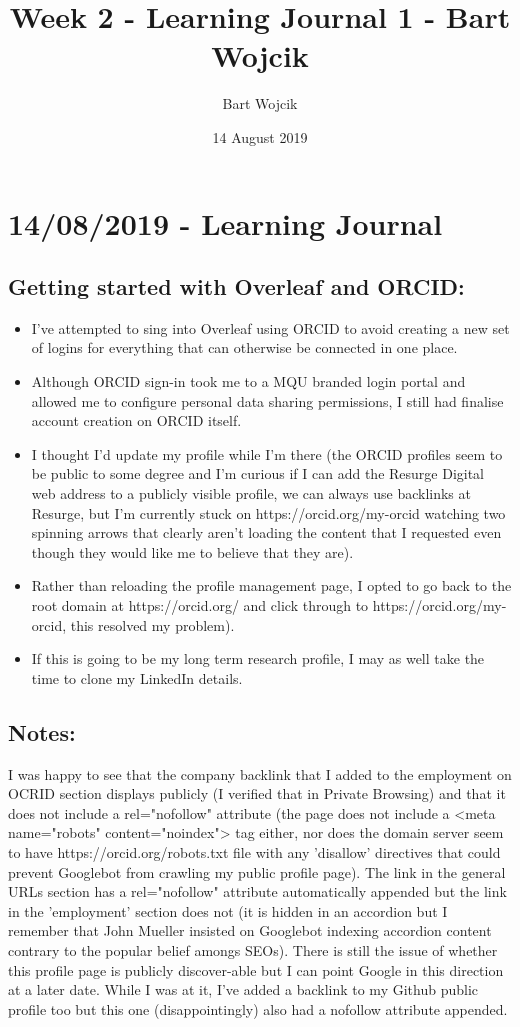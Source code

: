 \documentclass{article}
\title{Week 2 - Learning Journal 1 - Bart Wojcik}
\author{Bart Wojcik}
\date{14 August 2019}
\begin{document}
\maketitle

\section{14/08/2019 - Learning Journal}
\subsection{Getting started with Overleaf and ORCID:}
\medskip
\begin{itemize}
    \item I've attempted to sing into Overleaf using ORCID to avoid creating a new set of logins for everything that can otherwise be connected in one place.
    \item Although ORCID sign-in took me to a MQU branded login portal and allowed me to configure personal data sharing permissions, I still had finalise account creation on ORCID itself. 
    \item I thought I'd update my profile while I'm there (the ORCID profiles seem to be public to some degree and I'm curious if I can add the Resurge Digital web address to a publicly visible profile, we can always use backlinks at Resurge, but I'm currently stuck on https://orcid.org/my-orcid watching two spinning arrows that clearly aren't loading the content that I requested even though they would like me to believe that they are). 
    \item Rather than reloading the profile management page, I opted to go back to the root domain at https://orcid.org/ and click through to https://orcid.org/my-orcid, this resolved my problem). 
    \item If this is going to be my long term research profile, I may as well take the time to clone my LinkedIn details. 
\end{itemize}
\subsection{Notes:}
I was happy to see that the company backlink that I added to the employment on OCRID section displays publicly (I verified that in Private Browsing) and that it does not include a rel="nofollow" attribute (the page does not include a <meta name="robots" content="noindex"> tag either, nor does the domain server seem to have https://orcid.org/robots.txt file with any 'disallow' directives that could prevent Googlebot from crawling my public profile page). The link in the general URLs section has a rel="nofollow" attribute automatically appended but the link in the 'employment' section does not (it is hidden in an accordion but I remember that John Mueller insisted on Googlebot indexing accordion content contrary to the popular belief amongs SEOs). There is still the issue of whether this profile page is publicly discover-able but I can point Google in this direction at a later date. While I was at it, I've added a backlink to my Github public profile too but this one (disappointingly) also had a nofollow attribute appended.
\end{document}
